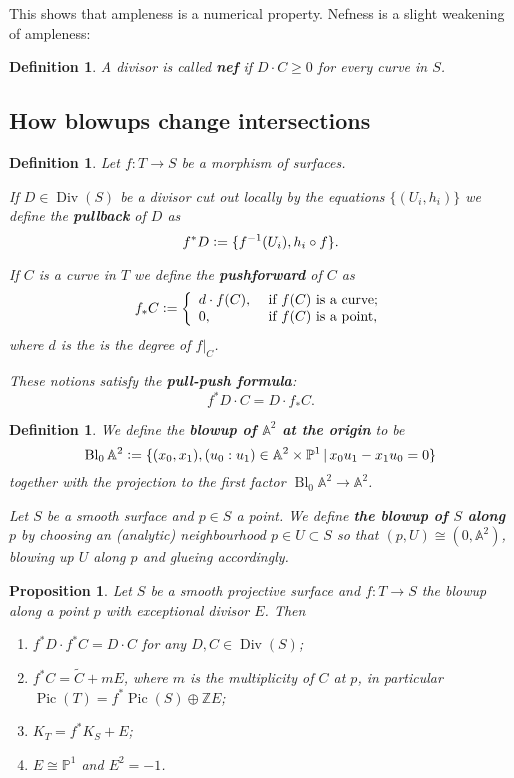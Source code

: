 \documentclass[a4paper,11pt]{amsart}
\newtheorem{proposition}[theorem]{Proposition}
\newtheorem{definition}[theorem]{Definition}
\def\Div{\operatorname{Div}}
\def\Bl{\operatorname{Bl}}
\def\Pic{\operatorname{Pic}}
\renewcommand{\AA}{\mathbb{A}}
\newcommand{\ZZ}{\mathbb{Z}}
\newcommand{\PP}{\mathbb{P}}
\newcommand{\isom}{\cong}
\newcommand{\defeq}{\vcentcolon=}
\begin{document}
This shows that ampleness is a numerical property.
Nefness is a slight weakening of ampleness:

\begin{definition}
	A divisor is called \textbf{nef} if $D\cdot C \geq 0$ for every curve in $S$.
\end{definition}




\subsection{How blowups change intersections}

\begin{definition}\label{def:pull-push}
	Let $f\colon T \to S$ be a morphism of surfaces.
	
	If $D \in \Div(S)$ be a divisor cut out locally by the equations $\{(U_i,h_i)\}$ we define the \textbf{pullback} of $D$ as
	\[
	f^*D \defeq \{f^{-1}(U_i), h_i\circ f\}.
	\]
	
	If $C$ is a curve in $T$ we define the \textbf{pushforward} of $C$ as
	\[
	f_*C \defeq 
	\left\{
	\begin{array}{ll}
			d \cdot f(C), & \text{ if $f(C)$ is a curve;}\\
		0, & \text{ if $f(C)$ is a point,}	
	\end{array}	
	\right.
	\]
	where $d$ is the is the degree of $f|_C$.
	
	These notions satisfy the \textbf{pull-push formula}:
	\[
	f^*D \cdot C = D \cdot f_*C.
	\]
\end{definition}

\begin{definition}
	We define the \textbf{blowup of $\AA^2$ at the origin} to be
	\[
	\Bl_0\AA^2 \defeq \{(x_0,x_1),(u_0:u_1) \in \AA^2 \times \PP^1 \, | \, x_0u_1 - x_1u_0 = 0\}
	\]
	together with the projection to the first factor $\Bl_0\AA^2 \to \AA^2$.
	
	Let $S$ be a smooth surface and $p\in S$ a point.
	We define \textbf{the blowup of $S$ along $p$} by choosing an (analytic) neighbourhood $p \in U \subset S$ so that $(p,U) \isom (0,\AA^2)$, blowing up $U$ along $p$ and glueing accordingly.
\end{definition}

\begin{proposition}\label{prop:blp}
	Let $S$ be a smooth projective surface and $f\colon T \to S$ the blowup along a point $p$ with exceptional divisor $E$.
	Then 
	\begin{enumerate}
		\item\label{it:bl1} $f^*D\cdot f^*C = D\cdot C$ for any $D,C \in \Div(S)$;
		\item\label{it:bl2} $f^*C = \tilde{C} + mE$, where $m$ is the multiplicity of $C$ at $p$, in particular $\Pic(T) = f^*\Pic(S) \oplus \ZZ E$;
		\item\label{it:bl3} $K_T = f^*K_S + E$;
		\item\label{it:bl4} $E \isom \PP^1$ and $E^2 = -1$.
	\end{enumerate}
\end{proposition}
\end{document}
